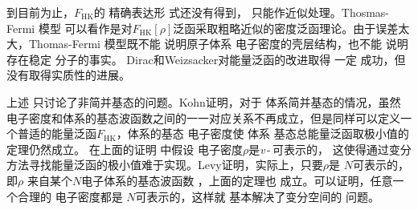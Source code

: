 到目前为止，$F_{\mathrm{HK}}$的%
{精确表达形}
式还没有得到，%
{只能作近似处理}。Thosmas-Fermi%
{模型}%
{可以看作是对$F_{\mathrm{HK}}[\rho]$泛函采取粗略近似的密度泛函理论。由于误差太}大，Thomas-Fermi%
{模型}既不能%
{说明}原子体系%
电子密度的壳层结构，也不能%
{说明存在}稳定%
分子{的事实}。%
Dirac和Weizsacker对能量泛函的改进取得%
一定%
{成功}，但%
{没有取得实质性的进展}。

上述%
只讨论了非简并基态的问题{。}Kohn证明，对于%
{体系简并基态}的情况，虽然%
{电}子密度和体系的基态波函数之间的一一对应关系不再成立，但是同样可以定义一个普适的能量泛函$F_{\mathrm{HK}}$，体系的基态%
{电}子密度使%
体系%
基态{总}能量{泛函}取极小{值的定理}仍然成立。%
{在上}面的证明%
{中}假设%
{电}子密度$\rho$是\textit{v}\,-\,可表示的，%
{这使得通过变分方法寻找能量泛函的极小值难于实现}。Levy证明，实际上，只要$\rho$是
{$N$}可表示的，即$\rho$%
{来自}某个$N$电子体系的基态波函数%
，上面的定理也%
成立。可以证明，任意一个合理的%
{电}子密度都是%
{$N$}可表示的，这样就%
基本解决{了}变分空间的%
问题。

